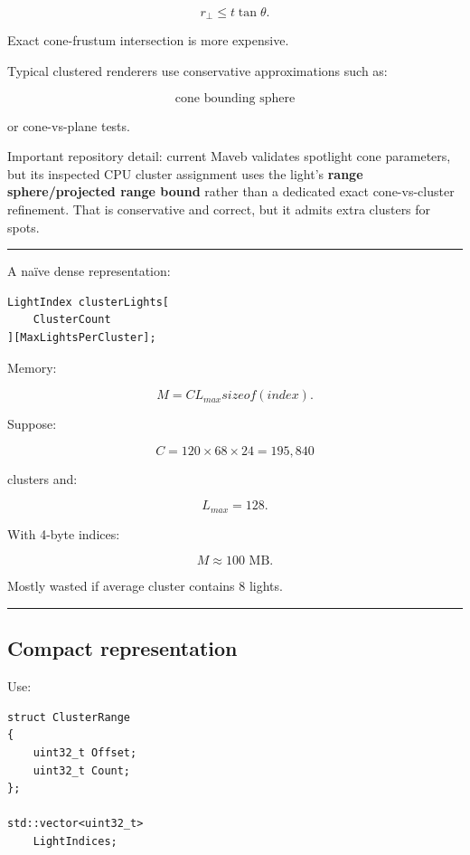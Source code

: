 \[
r_\perp
\le
t\tan\theta.
\]

Exact cone-frustum intersection is more expensive.

Typical clustered renderers use conservative approximations such as:

\[
\text{cone bounding sphere}
\]

or cone-vs-plane tests.

Important repository detail: current Maveb validates spotlight cone parameters, but its inspected CPU cluster assignment uses the light's \textbf{range sphere/projected range bound} rather than a dedicated exact cone-vs-cluster refinement. That is conservative and correct, but it admits extra clusters for spots.

\begin{center}\rule{0.5\linewidth}{0.5pt}\end{center}

A naïve dense representation:

\begin{verbatim}
LightIndex clusterLights[
    ClusterCount
][MaxLightsPerCluster];
\end{verbatim}

Memory:

\[
M=
C
L_{max}
sizeof(index).
\]

Suppose:

\[
C=120\times68\times24
=
195,840
\]

clusters and:

\[
L_{max}=128.
\]

With 4-byte indices:

\[
M\approx100\text{ MB}.
\]

Mostly wasted if average cluster contains 8 lights.

\begin{center}\rule{0.5\linewidth}{0.5pt}\end{center}

\subsection{Compact representation}\label{04-visual-computing-ii-ch040-compact-representation}

Use:

\begin{verbatim}
struct ClusterRange
{
    uint32_t Offset;
    uint32_t Count;
};

std::vector<uint32_t>
    LightIndices;
\end{verbatim}

